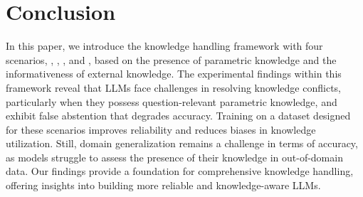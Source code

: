 
\section{Conclusion}

In this paper, we introduce the knowledge handling framework with four scenarios, \KI, \UI, \KU, and \UU, based on the presence of parametric knowledge and the informativeness of external knowledge.
The experimental findings within this framework reveal that LLMs face challenges in resolving knowledge conflicts, particularly when they possess question-relevant parametric knowledge, and exhibit false abstention that degrades accuracy.
Training on a dataset designed for these scenarios improves reliability and reduces biases in knowledge utilization. 
Still, domain generalization remains a challenge in terms of accuracy, as models struggle to assess the presence of their knowledge in out-of-domain data.
Our findings provide a foundation for comprehensive knowledge handling, offering insights into building more reliable and knowledge-aware LLMs.

